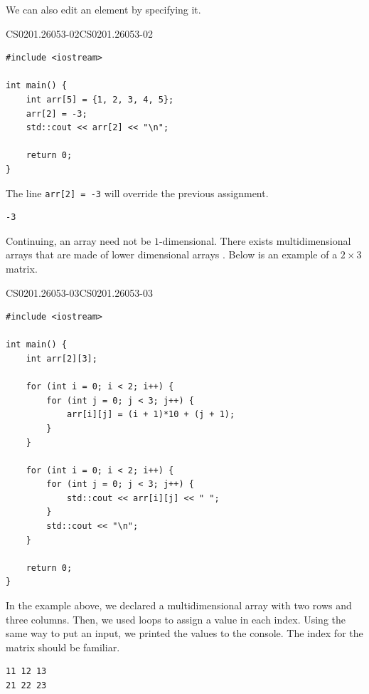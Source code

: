 \documentclass[../../../main.tex]{subfiles}
\begin{document}
We can also edit an element by specifying it.

\begin{cppbox}{CS0201.26053-02}{CS0201.26053-02}
\begin{lstlisting}[style=cppstyle]
#include <iostream>

int main() {
    int arr[5] = {1, 2, 3, 4, 5};
    arr[2] = -3;
    std::cout << arr[2] << "\n";

    return 0;
}
\end{lstlisting}
\end{cppbox}

The line \verb|arr[2] = -3| will override the previous assignment.

\begin{outputbox}
\begin{lstlisting}[style=basic]
-3
\end{lstlisting}
\end{outputbox}

Continuing, an array need not be $1$-dimensional. There exists
multidimensional arrays that are made of lower dimensional
arrays \cite{CS02-6}. Below is an example of a $2 \times 3$
matrix.

\begin{cppbox}{CS0201.26053-03}{CS0201.26053-03}
\begin{lstlisting}[style=cppstyle]
#include <iostream>

int main() {
    int arr[2][3];

    for (int i = 0; i < 2; i++) {
        for (int j = 0; j < 3; j++) {
            arr[i][j] = (i + 1)*10 + (j + 1);
        }
    }

    for (int i = 0; i < 2; i++) {
        for (int j = 0; j < 3; j++) {
            std::cout << arr[i][j] << " ";
        }
        std::cout << "\n";
    }

    return 0;
}
\end{lstlisting}
\end{cppbox}

In the example above, we declared a multidimensional array with
two rows and three columns. Then, we used loops to assign a value
in each index. Using the same way to put an input, we printed the
values to the console. The index for the matrix should be familiar.

\begin{outputbox}
\begin{lstlisting}[style=basic]
11 12 13
21 22 23
\end{lstlisting}
\end{outputbox}
\end{document}

